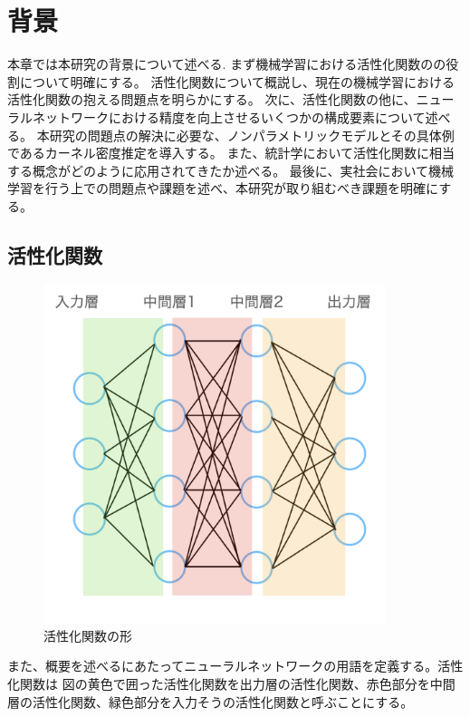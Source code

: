 \chapter{背景}
\label{background}

本章では本研究の背景について述べる.
まず機械学習における活性化関数のの役割について明確にする。
活性化関数について概説し、現在の機械学習における活性化関数の抱える問題点を明らかにする。
次に、活性化関数の他に、ニューラルネットワークにおける精度を向上させるいくつかの構成要素について述べる。
本研究の問題点の解決に必要な、ノンパラメトリックモデルとその具体例であるカーネル密度推定を導入する。
また、統計学において活性化関数に相当する概念がどのように応用されてきたか述べる。
最後に、実社会において機械学習を行う上での問題点や課題を述べ、本研究が取り組むべき課題を明確にする。



\section{活性化関数}

\begin{figure}[hbtp]
    \begin{center}
        \includegraphics[width=10cm]{asset/neural_network1.png}
            \caption{活性化関数の形}
            \label{neural_network1}
    \end{center}
\end{figure}

また、概要を述べるにあたってニューラルネットワークの用語を定義する。活性化関数は
図の黄色で囲った活性化関数を出力層の活性化関数、赤色部分を中間層の活性化関数、緑色部分を入力そうの活性化関数と呼ぶことにする。

